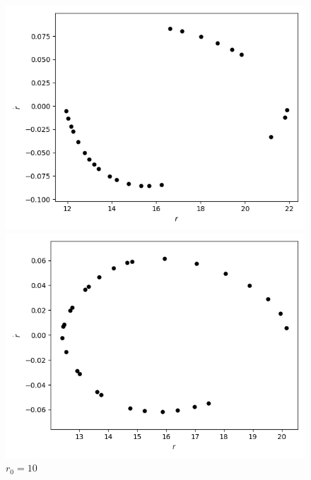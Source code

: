 \documentclass[10pt,a4paper]{report}
\begin{document}
\begin{figure}[!ht]
\begin{minipage}[b]{0.5\linewidth}
\centering
\includegraphics[width=\textwidth]{4/r0=8.png}
\caption{$r_0=8$}
\label{fig:figure1}
\end{minipage}
\hspace{0.5cm}
\begin{minipage}[b]{0.5\linewidth}
\centering
\includegraphics[width=\textwidth]{4/r0=10.png}
\caption{$r_0=10$}
\label{fig:figure2}
\end{minipage}
\end{figure}
\end{document}
